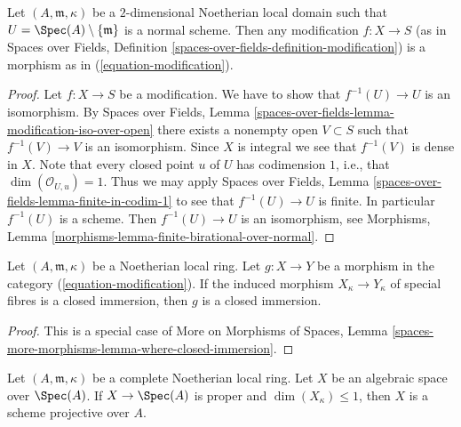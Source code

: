 \begin{lemma}
\label{lemma-modification}
Let $(A, \mathfrak m, \kappa)$ be a $2$-dimensional Noetherian
local domain such that $U = \Spec(A) \setminus \{\mathfrak m\}$
is a normal scheme. Then any modification $f : X \to S$
(as in Spaces over Fields, Definition
\ref{spaces-over-fields-definition-modification})
is a morphism as in (\ref{equation-modification}).
\end{lemma}

\begin{proof}
Let $f : X \to S$ be a modification. We have to show that
$f^{-1}(U) \to U$ is an isomorphism. By
Spaces over Fields, Lemma
\ref{spaces-over-fields-lemma-modification-iso-over-open}
there exists a nonempty open $V \subset S$ such that $f^{-1}(V) \to V$
is an isomorphism. Since $X$ is integral we see that $f^{-1}(V)$ is
dense in $X$. Note that every closed point $u$ of $U$ has codimension
$1$, i.e., that $\dim(\mathcal{O}_{U, u}) = 1$. Thus we may apply
Spaces over Fields, Lemma \ref{spaces-over-fields-lemma-finite-in-codim-1}
to see that $f^{-1}(U) \to U$ is finite. In particular $f^{-1}(U)$ is a scheme.
Then $f^{-1}(U) \to U$ is an isomorphism, see
Morphisms, Lemma \ref{morphisms-lemma-finite-birational-over-normal}.
\end{proof}

\begin{lemma}
\label{lemma-closed-immersion-on-fibre}
Let $(A, \mathfrak m, \kappa)$ be a Noetherian local ring.
Let $g : X \to Y$ be a morphism in the category (\ref{equation-modification}).
If the induced morphism $X_\kappa \to Y_\kappa$ of special fibres is
a closed immersion, then $g$ is a closed immersion.
\end{lemma}

\begin{proof}
This is a special case of
More on Morphisms of Spaces, Lemma
\ref{spaces-more-morphisms-lemma-where-closed-immersion}.
\end{proof}

\begin{lemma}
\label{lemma-projective-over-complete}
Let $(A, \mathfrak m, \kappa)$ be a complete Noetherian local ring.
Let $X$ be an algebraic space over $\Spec(A)$.
If $X \to \Spec(A)$ is proper and $\dim(X_\kappa) \leq 1$, then
$X$ is a scheme projective over $A$.
\end{lemma}

